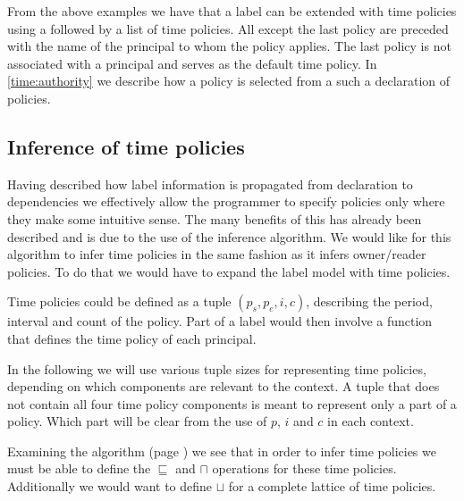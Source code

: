 From the above examples we have that a label can be extended with time policies using a  followed by a list of time policies.
All except the last policy are preceded with the name of the principal to whom the policy applies.
The last policy is not associated with a principal and serves as the default time policy.
In \cref{time:authority} we describe how a policy is selected from a such a declaration of policies.


\subsection{Inference of time policies}\label{time:inference}
Having described how label information is propagated from declaration to dependencies we effectively allow the programmer to specify policies only where they make some intuitive sense.
The many benefits of this has already been described and is due to the use of the inference algorithm.
We would like for this algorithm to infer time policies in the same fashion as it infers owner/reader policies.
To do that we would have to expand the label model with time policies.

Time policies could be defined as a tuple $(p_s, p_e, i, c)$, describing the period, interval and count of the policy.
Part of a label would then involve a function that defines the time policy of each principal.

In the following we will use various tuple sizes for representing time policies, depending on which components are relevant to the context.
A tuple that does not contain all four time policy components is meant to represent only a part of a policy.
Which part will be clear from the use of $p$, $i$ and $c$ in each context.

Examining the algorithm (page \pageref{dlm:inf:algorithm}) we see that in order to infer time policies we must be able to define the $\sqsubseteq$ and $\sqcap$ operations for these time policies.
Additionally we would want to define $\sqcup$ for a complete lattice of time policies.

